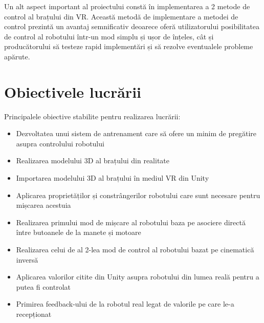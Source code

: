 Un alt aspect important al proiectului constă în implementarea a 2 metode de control al brațului din VR. Această metodă de implementare a metodei de control prezintă un avantaj semnificativ deoarece oferă utilizatorului posibilitatea de control al robotului într-un mod simplu și ușor de înțeles, cât și producătorului să testeze rapid implementări și să rezolve eventualele probleme apărute.





\section{Obiectivele lucrării}

Principalele obiective stabilite pentru realizarea lucrării:
\begin{itemize}
	\item Dezvoltatea unui sistem de antrenament care să ofere un minim de pregătire asupra controlului robotului
	\item Realizarea modelului 3D al brațului din realitate
	\item Importarea modelului 3D al brațului în mediul VR din Unity
	\item Aplicarea proprietăților și constrângerilor robotului care sunt necesare pentru mișcarea acestuia
	\item Realizarea primului mod de mișcare al robotului baza pe asociere directă între butoanele de la manete și motoare
	\item Realizarea celui de al 2-lea mod de control al robotului bazat pe cinematică inversă
	\item Aplicarea valorilor citite din Unity asupra robotului din lumea reală pentru a putea fi controlat
	\item Primirea feedback-ului de la robotul real legat de valorile pe care le-a recepționat
\end{itemize}


\clearpage





